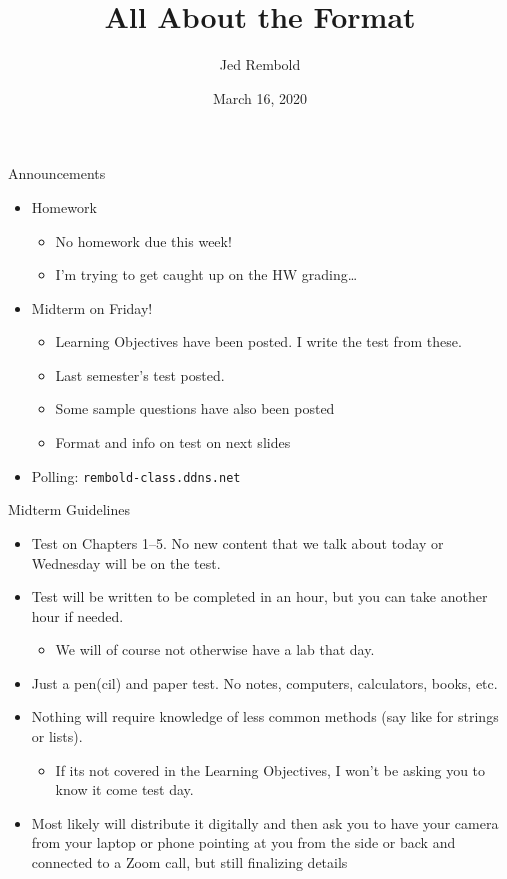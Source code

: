 \documentclass[pdf, aspectratio=169, 12pt]{beamer}
\title{All About the Format}
\author{Jed Rembold}
\date{March 16, 2020}
\begin{document}
\begin{frame}{Announcements}
	\begin{itemize}
		\item Homework
			\begin{itemize}
				\item No homework due this week!
				\item I'm trying to get caught up on the HW grading\ldots
			\end{itemize}
		\item Midterm on Friday!
			\begin{itemize}
				\item Learning Objectives have been posted. I write the test from these.
				\item Last semester's test posted.
				\item Some sample questions have also been posted
				\item Format and info on test on next slides
			\end{itemize}
		\item Polling: \nolinkurl{rembold-class.ddns.net}
	\end{itemize}
\end{frame}

\begin{frame}{Midterm Guidelines}
	\begin{itemize}
		\item Test on Chapters 1--5. No new content that we talk about today or Wednesday will be on the test.
		\item Test will be written to be completed in an hour, but you can take another hour if needed.
			\begin{itemize}
				\item We will of course not otherwise have a lab that day.
			\end{itemize}
			
		\item Just a pen(cil) and paper test. No notes, computers, calculators, books, etc.
		\item Nothing will require knowledge of less common methods (say like  for strings or lists).
			\begin{itemize}
				\item If its not covered in the Learning Objectives, I won't be asking you to know it come test day.
			\end{itemize}
		\item Most likely will distribute it digitally and then ask you to have your camera from your laptop or phone pointing at you from the side or back and connected to a Zoom call, but still finalizing details
	\end{itemize}
	
\end{frame}
\end{document}
